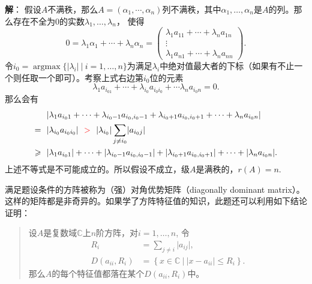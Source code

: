 {\bf 解}： 假设$A$不满秩，那么$A = (\alpha_1, \cdots, \alpha_n)$列不满秩，其中$\alpha_1, \ldots, \alpha_n$是$A$的列。那么存在不全为0的实数$\lambda_1, \ldots, \lambda_n$， 使得
$$0 = \lambda_1 \alpha_1 + \cdots + \lambda_n \alpha_n = \begin{pmatrix} \lambda_1 a_{11} + \cdots + \lambda_n a_{1n} \\ \vdots \\ \lambda_1 a_{n1} + \cdots + \lambda_n a_{nn} \end{pmatrix}.$$
令$i_0 = \operatorname{argmax} \{ \lvert \lambda_i \rvert \ |\ i = 1, \ldots, n \}$为满足$\lambda_i$中绝对值最大者的下标（如果有不止一个则任取一个即可）。考察上式右边第$i_0$位的元素
$$\lambda_{1} a_{i_01} + \cdots + \lambda_{i_0} a_{i_0i_0} + \cdots \lambda_n a_{i_0n} = 0.$$
那么会有
\begin{align*}
& ~~ \lvert \lambda_{1} a_{i_01} + \cdots + \lambda_{i_0-1} a_{i_0,i_0-1} + \lambda_{i_0+1} a_{i_0,i_0+1} + \cdots + \lambda_n a_{i_0n} \rvert \\
= & ~~ \lvert \lambda_{i_0} a_{i_0i_0} \rvert ~~ {\color{red} >} ~~ \lvert \lambda_{i_0} \rvert \sum\limits_{j\neq i_0} \lvert a_{i_0j} \rvert \\
\geqslant & ~~ \lvert \lambda_{1} a_{i_01} \rvert + \cdots + \lvert \lambda_{i_0-1} a_{i_0,i_0-1} \rvert + \lvert \lambda_{i_0+1} a_{i_0,i_0+1} \rvert + \cdots + \lvert \lambda_n a_{i_0n} \rvert.
\end{align*}
上述不等式是不可能成立的。所以假设不成立，级$A$是满秩的，$r(A) = n.$

满足题设条件的方阵被称为（强）对角优势矩阵（diagonally dominant matrix）。这样的矩阵都是非奇异的。如果学了方阵{\color{red}特征值}的知识，此题还可以利用如下结论证明：

\begin{quote}
设$A$是复数域$\mathbb{C}$上$n$阶方阵，对$i = 1, \ldots, n$, 令
\begin{align*}
R_{i} & = \sum_{j\neq {i}}\lvert a_{ij} \rvert, \\
D(a_{ii}, R_{i}) & = \left\{ x \in \mathbb{C} \ |\ \lvert x - a_{ii} \rvert \leqslant R_{i} \right\}.
\end{align*}
那么$A$的每个{\color{red}特征值}都落在某个$D(a_{ii}, R_{i})$中。
\end{quote}


